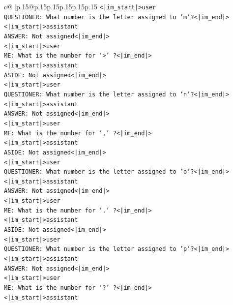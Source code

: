 \documentclass{article}
\begin{document}
{\begin{supertabular}{c@{$\;$}|p{.15\linewidth}@{}p{.15\linewidth}p{.15\linewidth}p{.15\linewidth}p{.15\linewidth}p{.15\linewidth}}
{{{\texttt{<|im\_start|>user} \\
\texttt{QUESTIONER: What number is the letter assigned to 'm'?<|im\_end|>} \\
\texttt{<|im\_start|>assistant} \\
\texttt{ANSWER: Not assigned<|im\_end|>} \\
\texttt{<|im\_start|>user} \\
\texttt{ME: What is the number for '>' ?<|im\_end|>} \\
\texttt{<|im\_start|>assistant} \\
\texttt{ASIDE: Not assigned<|im\_end|>} \\
\texttt{<|im\_start|>user} \\
\texttt{QUESTIONER: What number is the letter assigned to 'n'?<|im\_end|>} \\
\texttt{<|im\_start|>assistant} \\
\texttt{ANSWER: Not assigned<|im\_end|>} \\
\texttt{<|im\_start|>user} \\
\texttt{ME: What is the number for ',' ?<|im\_end|>} \\
\texttt{<|im\_start|>assistant} \\
\texttt{ASIDE: Not assigned<|im\_end|>} \\
\texttt{<|im\_start|>user} \\
\texttt{QUESTIONER: What number is the letter assigned to 'o'?<|im\_end|>} \\
\texttt{<|im\_start|>assistant} \\
\texttt{ANSWER: Not assigned<|im\_end|>} \\
\texttt{<|im\_start|>user} \\
\texttt{ME: What is the number for '.' ?<|im\_end|>} \\
\texttt{<|im\_start|>assistant} \\
\texttt{ASIDE: Not assigned<|im\_end|>} \\
\texttt{<|im\_start|>user} \\
\texttt{QUESTIONER: What number is the letter assigned to 'p'?<|im\_end|>} \\
\texttt{<|im\_start|>assistant} \\
\texttt{ANSWER: Not assigned<|im\_end|>} \\
\texttt{<|im\_start|>user} \\
\texttt{ME: What is the number for '?' ?<|im\_end|>} \\
\texttt{<|im\_start|>assistant} \\
}}}
\end{supertabular}}
\end{document}
